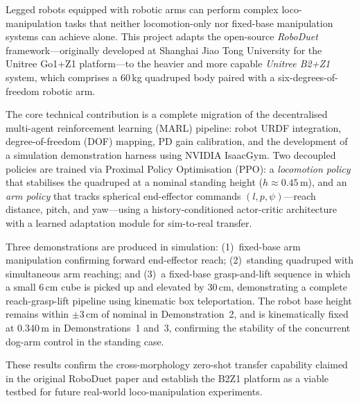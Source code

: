 
Legged robots equipped with robotic arms can perform complex loco-manipulation
tasks that neither locomotion-only nor fixed-base manipulation systems can
achieve alone.
This project adapts the open-source \textit{RoboDuet} framework---originally
developed at Shanghai Jiao Tong University for the Unitree Go1+Z1
platform---to the heavier and more capable \textit{Unitree B2+Z1} system,
which comprises a 60\,kg quadruped body paired with a six-degrees-of-freedom
robotic arm.

The core technical contribution is a complete migration of the decentralised
multi-agent reinforcement learning (MARL) pipeline: robot URDF integration,
degree-of-freedom (DOF) mapping, PD gain calibration, and the development of
a simulation demonstration harness using NVIDIA IsaacGym.
Two decoupled policies are trained via Proximal Policy Optimisation (PPO):
a \textit{locomotion policy} that stabilises the quadruped at a nominal
standing height ($h\approx0.45$\,m), and an \textit{arm policy} that tracks
spherical end-effector commands $(l, p, \psi)$---reach distance, pitch, and
yaw---using a history-conditioned actor-critic architecture with a learned
adaptation module for sim-to-real transfer.

Three demonstrations are produced in simulation:
(1)~fixed-base arm manipulation confirming forward end-effector reach;
(2)~standing quadruped with simultaneous arm reaching; and
(3)~a fixed-base grasp-and-lift sequence in which a small 6\,cm cube is
picked up and elevated by 30\,cm, demonstrating a complete reach-grasp-lift
pipeline using kinematic box teleportation.
The robot base height remains within $\pm$3\,cm of nominal in Demonstration~2,
and is kinematically fixed at 0.340\,m in Demonstrations~1 and~3, confirming
the stability of the concurrent dog-arm control in the standing case.

These results confirm the cross-morphology zero-shot transfer capability
claimed in the original RoboDuet paper and establish the B2Z1 platform as
a viable testbed for future real-world loco-manipulation experiments.
